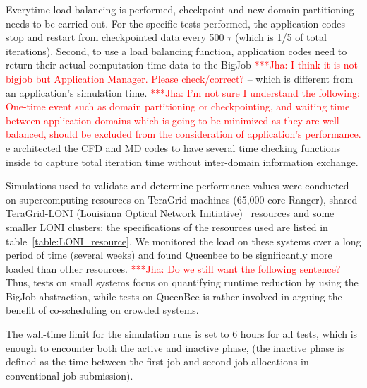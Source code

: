\documentclass[conference,final]{IEEEtran}
\newcommand{\jhanote}[1]{ {\textcolor{red} { ***Jha: #1 }}}
\newcommand{\jhanote}[1]{}
\begin{document}


Everytime load-balancing is performed, checkpoint and new domain
partitioning needs to be carried out. For the specific tests
performed, the application codes stop and restart from checkpointed
data every 500 $\tau$ (which is 1/5 of total iterations). Second, to
use a load balancing function, application codes need to return their
actual computation time data to the BigJob \jhanote{I think it is not
  bigjob but Application Manager. Please check/correct?}  -- which is
different from an application's simulation time.  \jhanote{I'm not
  sure I understand the following: One-time event such as domain
  partitioning or checkpointing, and waiting time between application
  domains which is going to be minimized as they are well-balanced,
  should be excluded from the consideration of application's
  performance.}  e architected the CFD and MD codes to have several
time checking functions inside to capture total iteration time without
inter-domain information exchange.

Simulations used to validate and determine performance values were
conducted on supercomputing resources on TeraGrid machines (65,000
core Ranger), shared TeraGrid-LONI (Louisiana Optical Network
Initiative)~\cite{LONI_web} resources and some smaller LONI clusters;
the specifications of the resources used are listed in
table~\ref{table:LONI_resource}.  We monitored the load on these
systems over a long period of time (several weeks) and found Queenbee
to be significantly more loaded than other resources.  \jhanote{Do we
  still want the following sentence?} Thus, tests on small systems
focus on quantifying runtime reduction by using the BigJob
abstraction, while tests on QueenBee is rather involved in arguing the
benefit of co-scheduling on crowded systems.

The wall-time limit for the simulation runs is set to 6 hours for all
tests, which is enough to encounter both the active and inactive
phase, (the inactive phase is defined as the time between the first
job and second job allocations in conventional job submission).
\end{document}
